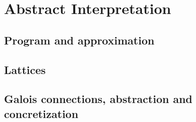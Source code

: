 \chapter{Abstract Interpretation}


\section{Program and approximation}

\section{Lattices}

\section{Galois connections, abstraction and concretization}
